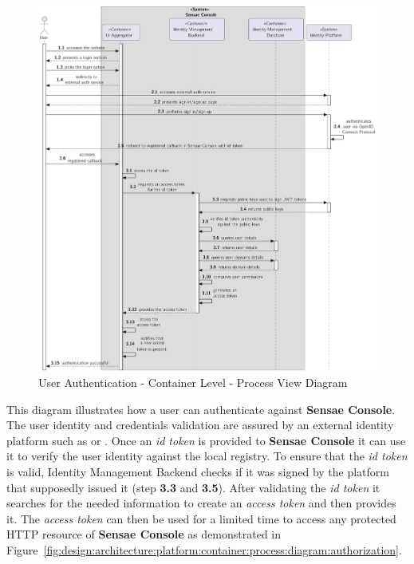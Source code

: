 \begin{figure}
   \centering
   \includegraphics[page=1,width=\columnwidth]{assets/diagrams/design/architectural/level2/process/user-authentication.pdf}
   \caption[User Authentication - Container Level - Process View Diagram]{User Authentication - Container Level - Process View Diagram}
   \label{fig:design:architecture:platform:container:process:diagram:authentication}
\end{figure}

This diagram illustrates how a user can authenticate against \textbf{Sensae Console}.
The user identity and credentials validation are assured by an external identity platform such as  or . Once an \textit{id token} is provided to \textbf{Sensae Console} it can use it to verify the user identity against the local registry. To ensure that the \textit{id token} is valid, Identity Management Backend checks if it was signed by the platform that supposedly issued it (step \textbf{3.3} and \textbf{3.5}). After validating the \textit{id token} it searches for the needed information to create an \textit{access token} and then provides it. The \textit{access token} can then be used for a limited time to access any protected HTTP resource of \textbf{Sensae Console} as demonstrated in Figure~\ref{fig:design:architecture:platform:container:process:diagram:authorization}.

